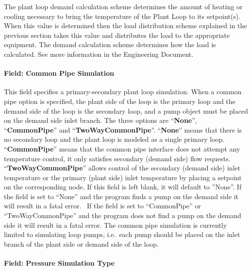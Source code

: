 The plant loop demand calculation scheme determines the amount of heating or cooling necessary to bring the temperature of the Plant Loop to its setpoint(s). When this value is determined then the load distribution scheme explained in the previous section takes this value and distributes the load to the appropriate equipment. The demand calculation scheme determines how the load is calculated. See more information in the Engineering Document.

\paragraph{Field: Common Pipe Simulation}\label{field-common-pipe-simulation}

This field specifies a primary-secondary plant loop simulation. When a common pipe option is specified, the plant side of the loop is the primary loop and the demand side of the loop is the secondary loop, and a pump object must be placed on the demand side inlet branch. The three options are ``\textbf{None}'', ``\textbf{CommonPipe}'' and ``\textbf{TwoWayCommonPipe}''. ``\textbf{None}'' means that there is no secondary loop and the plant loop is modeled as a single primary loop. ``\textbf{CommonPipe}'' means that the common pipe interface does not attempt any temperature control, it only satisfies secondary (demand side) flow requests. ``\textbf{TwoWayCommonPipe}'' allows control of the secondary (demand side) inlet temperature or the primary (plant side) inlet temperature by placing a setpoint on the corresponding node. If this field is left blank, it will default to ''None''. If the field is set to ``None'' and the program finds a pump on the demand side it will result in a fatal error.~ If the field is set to ``CommonPipe'' or ``TwoWayCommonPipe'' and the program does not find a pump on the demand side it will result in a fatal error. The common pipe simulation is currently limited to simulating loop pumps, i.e.~each pump should be placed on the inlet branch of the plant side or demand side of the loop.

\paragraph{Field: Pressure Simulation Type}\label{field-pressure-simulation-type}

